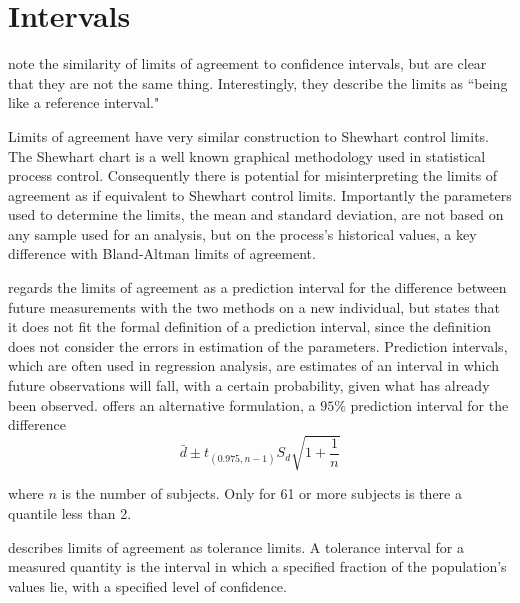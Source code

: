 \documentclass[Main.tex]{subfiles}
\begin{document}
	
	

\section{Intervals}

	\citet{BA99} note the similarity of limits of agreement to
	confidence intervals, but are clear that they are not the same
	thing. Interestingly, they describe the limits as ``being like a
	reference interval."
	
	Limits of agreement have very similar construction to Shewhart
	control limits. The Shewhart chart is a well known graphical
	methodology used in statistical process control. Consequently
	there is potential for misinterpreting the limits of agreement as
	if equivalent to Shewhart control limits. Importantly the
	parameters used to determine the limits, the mean and standard
	deviation, are not based on any sample used for an analysis, but
	on the process's historical values, a key difference with
	Bland-Altman limits of agreement.
	
	\citet{BXC2008} regards the limits of agreement as a prediction
	interval for the difference between future measurements with the
	two methods on a new individual, but states that it does not fit
	the formal definition of a prediction interval, since the
	definition does not consider the errors in estimation of the
	parameters. Prediction intervals, which are often used in
	regression analysis, are estimates of an interval in which future
	observations will fall, with a certain probability, given what has
	already been observed. \citet{BXC2008} offers an alternative
	formulation, a $95\%$ prediction interval for the difference
	\begin{equation}
	\bar{d} \pm t_{(0.975, n-1)}S_{d} \sqrt{1+\frac{1}{n}}
	\end{equation}
	
	\noindent where $n$ is the number of subjects. Only for 61 or more
	subjects is there a quantile less than 2.
	
	\citet{luiz} describes limits of agreement as tolerance limits. A
	tolerance interval for a measured quantity is the interval in
	which a specified fraction of the population's values lie, with a
	specified level of confidence.
	
	
\end{document}
